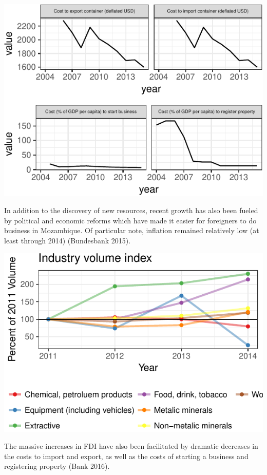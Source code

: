 \documentclass[]{elsarticle} %
\begin{document}
\begin{center}\includegraphics{paper_files/figure-latex/unnamed-chunk-7-1} \end{center}

In addition to the discovery of new resources, recent growth has also
been fueled by political and economic reforms which have made it easier
for foreigners to do business in Mozambique. Of particular note,
inflation remained relatively low (at least through 2014) (Bundesbank
2015).

\begin{center}\includegraphics{paper_files/figure-latex/unnamed-chunk-8-1} \end{center}

The massive increases in FDI have also been facilitated by dramatic
decreases in the costs to import and export, as well as the costs of
starting a business and registering property (Bank 2016).
\end{document}
